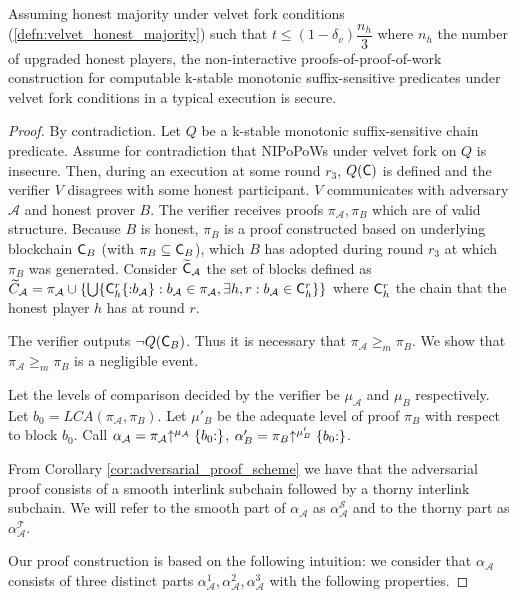 \begin{theorem}
	Assuming honest majority under velvet fork conditions (\ref{defn:velvet_honest_majority}) such that $t \leq (1 - \delta_v) \dfrac{n_h}{3}$ where $n_h$ the number of upgraded honest players, the non-interactive proofs-of-proof-of-work construction for computable k-stable monotonic suffix-sensitive predicates under velvet fork conditions in a typical execution is secure.
\end{theorem}
\begin{proof}
By contradiction. Let $Q$ be a k-stable monotonic suffix-sensitive chain predicate. Assume for contradiction that NIPoPoWs under velvet fork on $Q$ is insecure. Then, during an execution at some round  $r_3$, $Q(\mathsf{C})$ is defined and the verifier $V$ disagrees with some honest participant. $V$ communicates with adversary $\mathcal{A}$ and honest prover $B$. The verifier receives proofs $\pi_\mathcal{A}, \pi_B$ which are of valid structure. Because $B$ is honest, $\pi_B$ is a proof constructed based on underlying blockchain $\mathsf{C}_B$ (with $\pi_B \subseteq \mathsf{C}_B$), which $B$ has adopted during round $r_3$ at which $\pi_B$ was generated. Consider $\widetilde{\mathsf{C}}_\mathcal{A}$ the set of blocks defined as $\widetilde{C}_\mathcal{A} = \pi_\mathcal{A} \cup \{ \bigcup \{\mathsf{C}_h^r\{{:}b_\mathcal{A}\}:  b_\mathcal{A} \in \pi_\mathcal{A}, \exists h,r : b_\mathcal{A} \in \mathsf{C}_{h}^{r}\}  \}$ where $\mathsf{C}_h^r$ the chain that the honest player $h$ has at round $r$.

The verifier outputs $\neg Q(\mathsf{C}_B)$. Thus it is necessary that $\pi_\mathcal{A} {\geq}_m \pi_B$. We show that $\pi_\mathcal{A} {\geq}_m \pi_B$ is a negligible event.

Let the levels of comparison decided by the verifier be $\mu_\mathcal{A}$ and $\mu_B$ respectively. Let $b_0 = LCA(\pi_\mathcal{A}, \pi_B)$. Let $\mu'_B$ be the adequate level of proof $\pi_B$  with respect to block $b_0$. Call $\alpha_\mathcal{A} = \pi_\mathcal{A} \negthickspace\uparrow^{\mu_\mathcal{A}}\{b_0{:}\}$, $\alpha'_B = \pi_B \negthickspace\uparrow^{\mu'_B}\{b_0{:}\}$.

From Corollary \ref{cor:adversarial_proof_scheme} we have that the adversarial proof consists of a smooth interlink subchain followed by a thorny interlink subchain. We will refer to the smooth part of $\alpha_\mathcal{A}$ as $\alpha^{\mathcal{S}}_\mathcal{A}$ and to the thorny part as $\alpha^{\mathcal{T}}_\mathcal{A}$.

Our proof construction is based on the following intuition: we consider that $\alpha_\mathcal{A}$ consists of three distinct parts $\alpha_\mathcal{A}^1, \alpha_\mathcal{A}^2, \alpha_\mathcal{A}^3$ with the following properties.


\end{proof}
